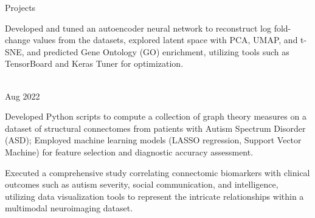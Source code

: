 \documentclass[]{resume-knyte}
\begin{document}
\begin{topic}{Projects}
{        \item Developed and tuned an autoencoder neural network to reconstruct log fold-change values from the datasets, explored latent space with PCA, UMAP, and t-SNE, and predicted Gene Ontology (GO) enrichment, utilizing tools such as TensorBoard and Keras Tuner for optimization.
        \vspace{-5pt}
    }\\

    {Aug 2022}
    {
        \item Developed Python scripts to compute a collection of graph theory measures on a dataset of structural connectomes from patients with Autism Spectrum Disorder (ASD); Employed machine learning models (LASSO regression, Support Vector Machine) for feature selection and diagnostic accuracy assessment.
        \vspace{-15pt}

        \item Executed a comprehensive study correlating connectomic biomarkers with clinical outcomes such as autism severity, social communication, and intelligence, utilizing data visualization tools to represent the intricate relationships within a multimodal neuroimaging dataset.
        \vspace{10pt}
    }
\end{topic}
\vspace{50pt}
\end{document}
